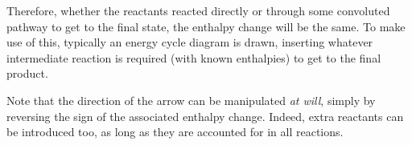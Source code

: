 		Therefore, whether the reactants reacted directly or through some convoluted pathway to get to the final state, the enthalpy
		change will be the same. To make use of this, typically an energy cycle diagram is drawn, inserting whatever intermediate reaction
		is required (with known enthalpies) to get to the final product.


		Note that the direction of the arrow can be manipulated \textit{at will}, simply by reversing the sign of the associated enthalpy
		change. Indeed, extra reactants can be introduced too, as long as they are accounted for in all reactions.






































































